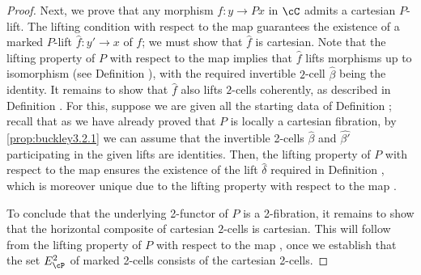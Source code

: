 \documentclass[11pt, dvipsnames]{amsart}
\begin{document}
\begin{proof}
			Next, we prove that any morphism $f\colon y \to Px$ in $\cC$ admits a cartesian $P$-lift. The lifting condition with respect to the map  guarantees the existence of a marked $P$-lift $\widehat{f}\colon y' \to x$ of $f$; we must show that  $\widehat{f}$ is cartesian. Note that the lifting property of $P$ with respect to the map  implies that  $\widehat{f}$ lifts morphisms up to isomorphism (see Definition ), with the required invertible $2$-cell $\widehat{\beta}$ being the identity. It remains to show that $\widehat{f}$ also lifts $2$-cells coherently, as described in Definition . For this,  suppose we are given all the starting data of Definition ; recall that as we have already proved that $P$ is locally a cartesian fibration, by \cref{prop:buckley3.2.1} we can assume that the invertible 2-cells $\widehat{\beta}$ and $\widehat{\beta'}$ participating in the given lifts are identities. Then, the lifting property of $P$ with respect to the map  ensures the existence of the lift $\widehat{\delta}$ required in Definition , which is moreover unique due to the lifting property with respect to the map .

        To conclude that the underlying 2-functor of $P$ is a 2-fibration, it remains to show that the horizontal composite of cartesian $2$-cells is cartesian. This will follow from the lifting property of $P$ with respect to the map , once we establish that the set $E^2_\cP$ of marked 2-cells consists of the cartesian 2-cells. 
		

\end{proof}
\end{document}
